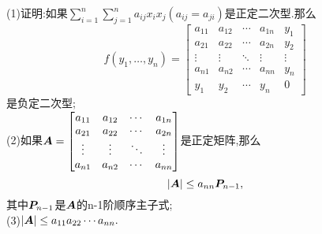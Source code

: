 \documentclass[lang=cn,11pt,normal]{elegantbook}
\begin{document}
	\begin{exercise}
		(1)证明:如果${\displaystyle \sum^n_{i=1}\sum^n_{j=1}}a_{ij}x_ix_j(a_{ij}=a_{ji})$是正定二次型.那么
		\begin{equation}
		f(y_1,\dots,y_n)=
		\begin{bmatrix}
		a_{11}&a_{12}&\cdots&a_{1n}&y_1\\
		a_{21}&a_{22}&\cdots&a_{2n}&y_2\\
		\vdots&\vdots&\ddots&\vdots&\vdots\\
		a_{n1}&a_{n2}&\cdots&a_{nn}&y_n\\
		y_1&y_2&\cdots&y_n&0
		\end{bmatrix}
		\end{equation}
		是负定二次型;\\
		(2)如果$\AA=
		\begin{bmatrix}
		a_{11}&a_{12}&\cdots&a_{1n}\\
		a_{21}&a_{22}&\cdots&a_{2n}\\
		\vdots&\vdots&\ddots&\vdots\\
		a_{n1}&a_{n2}&\cdots&a_{nn}
		\end{bmatrix}
		$是正定矩阵,那么
		\begin{equation}
		|\AA|\leq a_{nn}\PP_{n-1},
		\end{equation}
		其中$\PP_{n-1}$是$\AA$的n-1阶顺序主子式;\\
		(3)$|\AA|\leq a_{11}a_{22}\cdots a_{nn}.$
	\end{exercise}
\end{document}
